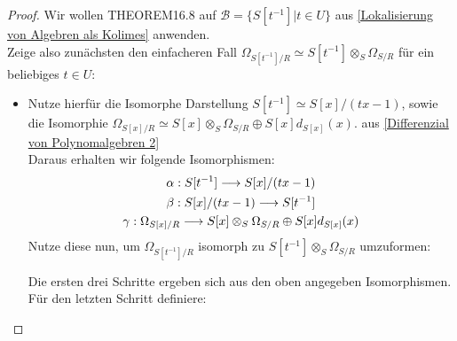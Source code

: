 \documentclass[10pt,a4paper]{report}
\newcommand{\comment}[1]{}
\newcommand{\functionfront}[3]{\nolinebreak{#1:#2 \longrightarrow #3}}
\newcommand{\divR}[2]{\Omega_{#1/#2}}
\newcommand{\divf}[1]{d_{#1}}
\newcommand{\Tensor}[3]{#1 \otimes_{#2} #3}
\newcommand{\tensor}[3]{#1 \otimes #3}
\newcommand{\lok}[2]{#1 [#2^{-1}]}
\newcommand{\loke}[3]{(\frac{#1}{#2})_{_{#3}}}
\newcommand*{\defeqr}{= \mathrel{\vcenter{\baselineskip0.5ex \lineskiplimit0pt
                     \hbox{\scriptsize.}\hbox{\scriptsize.}}}}
\begin{document}
\begin{proof}
Wir wollen THEOREM16.8 \comment{\label{THEOREM16.8}} auf $\mathcal{B} = \lbrace \lok{S}{t} \vert t \in U \rbrace$ aus \cref{Lokalisierung von Algebren als Kolimes} anwenden.\\
Zeige also zunächsten den einfacheren Fall $\divR{\lok{S}{t}}{R} \simeq \Tensor{\lok{S}{t}}{S}{\divR{S}{R}}$ für ein beliebiges $t \in U$:
\begin{itemize}
\item[]
Nutze hierfür die Isomorphe Darstellung $\lok{S}{t} \simeq S[x]/(tx -1)$, sowie die Isomorphie $\divR{S[x]}{R} \simeq \Tensor{S[x]}{S}{\divR{S}{R}} \oplus S[x]\divf{S[x]}(x)$. aus \cref{Differenzial von Polynomalgebren 2}\\
Daraus erhalten wir folgende Isomorphismen:
\begin{gather*}
\functionfront{\alpha}{\lok{S}{t}}{S[x]/(tx -1)} \\
\functionfront{\beta}{S[x]/(tx -1)}{\lok{S}{t}} \\
\functionfront{\gamma}{\divR{S[x]}{R}}{ \Tensor{S[x]}{S}{\divR{S}{R}} \oplus S[x]\divf{S[x]}(x) }
\end{gather*}
Nutze diese nun, um $\divR{\lok{S}{t}}{R}$ isomorph zu $\Tensor{\lok{S}{t}}{S}{\divR{S}{R}}$ umzuformen:
\begin{center}
\end{center}
Die ersten drei Schritte ergeben sich aus den oben angegeben Isomorphismen. Für den letzten Schritt definiere:

\end{itemize}
\end{proof}
\end{document}
